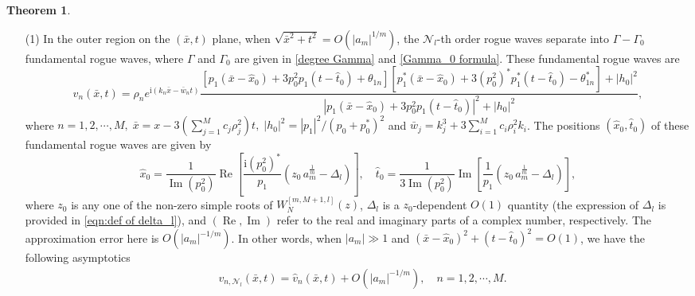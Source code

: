 \documentclass[preprint,3p,10pt]{elsarticle}
\renewcommand{\Re}{\operatorname{Re}}
\renewcommand{\Im}{\operatorname{Im}}
\theoremstyle{definition}
\newtheorem{theorem}{Theorem}[section]
\begin{document}
\begin{theorem}
 \begin{itemize}
   \item [(1)]  In the outer region on the $(\bar{x},t)$ plane, when $\sqrt{\bar{x}^{2}+t^{2}}=O\left(\left|a_m\right|^{1 /m}\right)$, the $\mathcal{N}_l$-th order rogue waves separate into $\Gamma-\Gamma_0$ fundamental rogue waves, where $\Gamma$ and $\Gamma_0$ are given in \eqref{degree Gamma} and \eqref{Gamma_0 formula}. 
These fundamental rogue waves are
\begin{equation}
\hat{v}_n(\bar{x}, t)=\rho_n e^{\mathrm{i}\left(k_n \bar{x}-\bar{w}_n t\right)}  \dfrac{\left[p_1 \left(\bar{x}-\hat{x}_0\right)+3p_0^2p_1 (t-\hat{t}_0)+\theta_{1n}\right]\left[p_1^* (\bar{x}-\hat{x}_0)+ 3(p_0^2)^*p_1^* (t-\hat{t}_0)-\theta_{1n}^*\right]+\left|h_0\right|^2}{\left|p_1 (\bar{x}-\hat{x}_0)+3p_0^2p_1 (t-\hat{t}_0)\right|^2+\left|h_0\right|^2},
\end{equation}
where $n=1,2,\cdots,M, \;\bar{x}=x-3\left(\sum_{j=1}^{M}c_j \rho_j^2\right)t, \; |h_0|^2=\left|p_1\right|^2/\left(p_0+p_0^*\right)^2$ and $\bar{w}_j=k_j^3+3\sum_{i=1}^{M}c_i\rho_i^2 k_i$.
The positions $(\hat{x}_0, \hat{t}_0)$ of these fundamental rogue waves are given by
\begin{equation}
    \hat{x}_0=\frac{1}{\Im(p_0^2)}\Re\!\left[\frac{\mathrm{i}\left(p_0^2\right)^*}{p_1} \left(z_0\,a_m^{\frac{1}{m}}-\Delta_l\right)\right],\quad \hat{t}_0=\frac{1}{3\Im(p_0^2)}\Im\!\left[\dfrac{1}{p_1} \left(z_0\,a_m^{\frac{1}{m}}-\Delta_l\right)\right],\label{eqn:prediction of locations of RW}
\end{equation}
where $z_0$ is any one of the non-zero simple roots of $W_{N}^{[m,M+1,l]}(z)$, $\Delta_l$ is a $z_0$-dependent $O(1)$ quantity (the expression of $\Delta_l$ is provided in \eqref{eqn:def of delta_l}), and $\left(\Re,\Im\right)$ refer to the real and imaginary parts of a complex number, respectively. The approximation error here is $ O\left(|a_{m}|^{-1 /m}\right)$.
In other words, when $|a_m|\gg1 $ and $\left(\bar{x}-\hat{x}_0\right)^2+\left(t-\hat{t}_0\right)^2=O(1)$, we have the following asymptotics
\begin{eqnarray}
&v_{n, \mathcal{N}_l}(\bar{x}, t)=\hat{v}_n\left(\bar{x}, t\right) +O\left(\left|a_m\right|^{-1 / m}\right), \quad n =1,2,\cdots,M.
\end{eqnarray}



\end{itemize}
\end{theorem}
\end{document}
